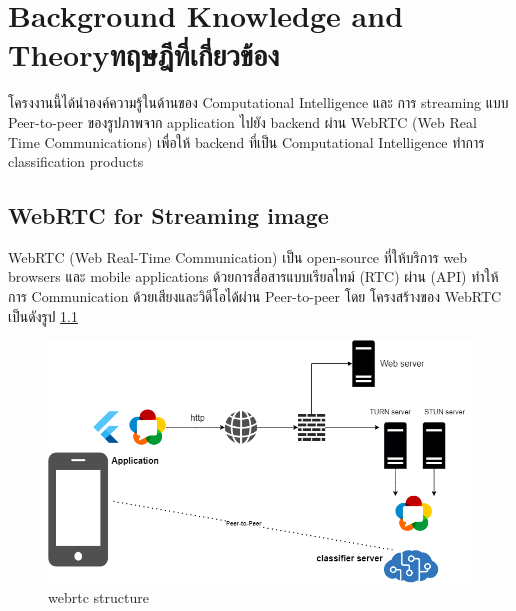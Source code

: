 \chapter{\ifenglish Background Knowledge and Theory\else ทฤษฎีที่เกี่ยวข้อง\fi}

\par โครงงานนี้ได้นำองค์ความรู้ในด้านของ Computational Intelligence และ การ streaming แบบ Peer-to-peer   
ของรูปภาพจาก application ไปยัง backend ผ่าน WebRTC (Web Real Time Communications) เพื่อให้ backend 
ที่เป็น Computational Intelligence ทำการ classification products  
  
  
\section{WebRTC for Streaming image \cite{WebRTC}}
\par WebRTC (Web Real-Time Communication) เป็น open-source  ที่ให้บริการ  web browsers
 และ mobile applications ด้วยการสื่อสารแบบเรียลไทม์ (RTC) ผ่าน (API)  
 ทำให้การ Communication ด้วยเสียงและวิดีโอได้ผ่าน  Peer-to-peer   โดย โครงสร้างของ WebRTC เป็นดังรูป \ref{fig:webrtc structure}
 
 
\begin{figure}[h]
\begin{center}
\includegraphics[scale=0.5]{pic/webrtc.png}
\end{center}

\caption[webrtc structure]{webrtc structure}
\label{fig:webrtc structure}
\end{figure}



